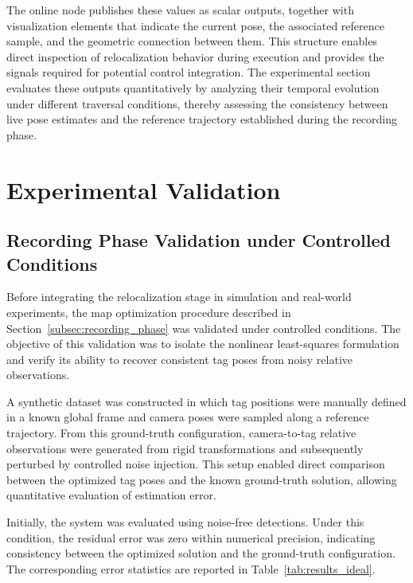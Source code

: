 \documentclass[a4paper,11pt]{article}
\begin{document}
The online node publishes these values as scalar outputs, together with visualization elements that indicate the current pose, the associated reference sample, and the geometric connection between them. This structure enables direct inspection of relocalization behavior during execution and provides the signals required for potential control integration. The experimental section evaluates these outputs quantitatively by analyzing their temporal evolution under different traversal conditions, thereby assessing the consistency between live pose estimates and the reference trajectory established during the recording phase.





\section{Experimental Validation}
\label{sec:results}


\subsection{Recording Phase Validation under Controlled Conditions}
\label{subsec:optimization_validation}

Before integrating the relocalization stage in simulation and real-world experiments, the map optimization procedure described in Section~\ref{subsec:recording_phase} was validated under controlled conditions. The objective of this validation was to isolate the nonlinear least-squares formulation and verify its ability to recover consistent tag poses from noisy relative observations.

A synthetic dataset was constructed in which tag positions were manually defined in a known global frame and camera poses were sampled along a reference trajectory. From this ground-truth configuration, camera-to-tag relative observations were generated from rigid transformations and subsequently perturbed by controlled noise injection. This setup enabled direct comparison between the optimized tag poses and the known ground-truth solution, allowing quantitative evaluation of estimation error.

Initially, the system was evaluated using noise-free detections. Under this condition, the residual error was zero within numerical precision, indicating consistency between the optimized solution and the ground-truth configuration. The corresponding error statistics are reported in Table~\ref{tab:results_ideal}.
\end{document}
